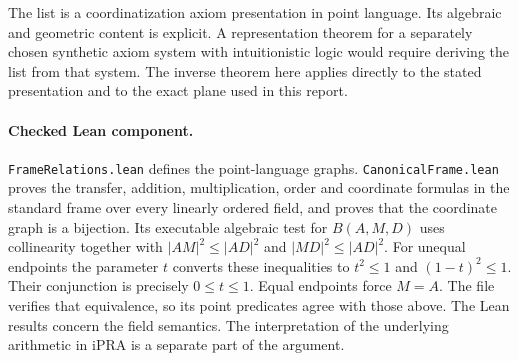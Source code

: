The list is a coordinatization axiom presentation in point language.
Its algebraic and geometric content is explicit. A representation theorem
for a separately chosen synthetic axiom system with intuitionistic logic
would require deriving the list from that system. The inverse theorem here
applies directly to the stated presentation and to the exact plane used
in this report.

\paragraph{Checked Lean component.}
\texttt{FrameRelations.lean} defines the point-language graphs.
\texttt{CanonicalFrame.lean} proves the transfer, addition, multiplication,
order and coordinate formulas in the standard frame over every linearly
ordered field, and proves that the coordinate graph is a bijection.
Its executable algebraic test for $B(A,M,D)$ uses collinearity together
with $|AM|^2\le |AD|^2$ and $|MD|^2\le |AD|^2$.
For unequal endpoints the parameter $t$ converts these inequalities to
$t^2\le1$ and $(1-t)^2\le1$. Their conjunction is precisely
$0\le t\le1$. Equal endpoints force $M=A$. The file verifies that
equivalence, so its point predicates agree with those above. The Lean
results concern the field semantics. The interpretation of the underlying
arithmetic in iPRA is a separate part of the argument.
